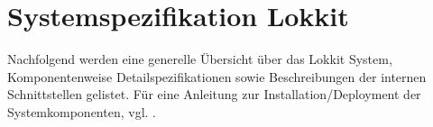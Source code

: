 \chapter{Systemspezifikation Lokkit}
\label{cha:Systemspezifikation}
Nachfolgend werden eine generelle Übersicht über das Lokkit System, Komponentenweise Detailspezifikationen sowie Beschreibungen der internen Schnittstellen gelistet. Für eine Anleitung zur Installation/Deployment der Systemkomponenten, vgl. .





